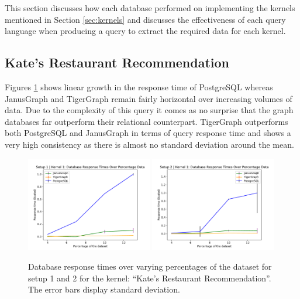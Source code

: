 This section discusses how each database performed on implementing the kernels mentioned in Section \ref{sec:kernels} and discusses the effectiveness of each query language when producing a query to extract the required data for each kernel.

\subsection{Kate's Restaurant Recommendation}

Figures \ref{fig:katePerfResults} shows linear growth in the response time of PostgreSQL whereas JanusGraph and TigerGraph remain fairly horizontal over increasing volumes of data. Due to the complexity of this query it comes as no surprise that the graph databases far outperform their relational counterpart. TigerGraph outperforms both PostgreSQL and JanusGraph in terms of query response time and shows a very high consistency as there is almost no standard deviation around the mean.

\begin{figure}[h]
    \centering
    \includegraphics[width=0.49\textwidth]{img/perfResults/katePlotSetup1.pdf}
    \includegraphics[width=0.49\textwidth]{img/perfResults/katePlotSetup2.pdf}
    \caption{Database response times over varying percentages of the dataset for setup 1 and 2 for the kernel: ``Kate's Restaurant Recommendation''. The error bars display standard deviation.}
    \label{fig:katePerfResults}
\end{figure}

